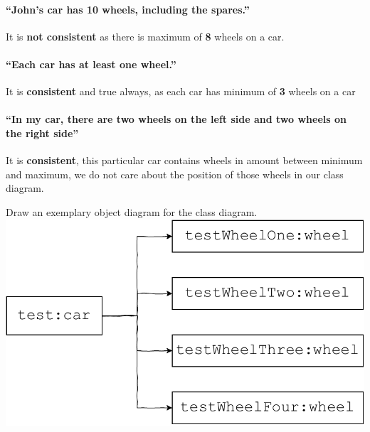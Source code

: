 \documentclass[12pt]{article}
\begin{document}
\paragraph{“John’s car has 10 wheels, including the spares.” }
It is \textbf{not consistent} as there is maximum of \textbf{8} wheels on a car.
\paragraph{“Each car has at least one wheel.” }
It is \textbf{consistent} and true always, as each car has minimum of \textbf{3} wheels on a car
\paragraph{“In my car, there are two wheels on the left side and two wheels on the right side”  } 
It is \textbf{consistent}, this particular car contains wheels in amount between minimum and maximum, we do not care about the position of those wheels in our class diagram. \newpage


Draw an exemplary object diagram for the class diagram. \\ 

\includegraphics[width=\textwidth]{4.pdf}
\newpage
\end{document}
